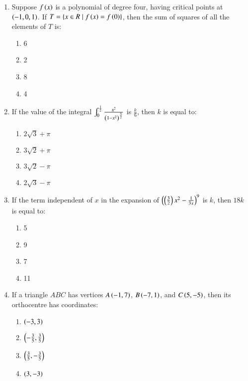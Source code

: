 \documentclass[journal,9pt,twocolumn]{IEEEtran}
\begin{document}
\begin{enumerate}
\item Suppose $f\left(x\right)$ is a polynomial of degree four, having critical points at $\left(-1, 0, 1\right)$. If $T = \{ x \in R \mid f\left(x\right) = f\left(0\right) \}$, then the sum of squares of all the elements of $T$ is:
        \begin{multicols}{4}

\begin{enumerate}
    \item 6
    \item 2
    \item 8
    \item 4
\end{enumerate}
\end{multicols}

\item If the value of the integral $ \int_{0}^{\frac{1}{2}} \frac{x^2}{\left(1 - x^2\right)^{\frac{3}{2}}}$ is $\frac{k}{6}$, then $k$ is equal to:
        
        \begin{multicols}{2}
\begin{enumerate}
    \item $2\sqrt{3} + \pi$
    \item $3\sqrt{2} + \pi$
    \item $3\sqrt{2} - \pi$
    \item $2\sqrt{3} - \pi$
\end{enumerate}
\end{multicols}

 \item If the term independent of $x$ in the expansion of $\left( \left( \frac{3}{2} \right) x^2 - \frac{1}{3x} \right)^9$ is $k$, then $18k$ is equal to:
        \begin{multicols}{4}

\begin{enumerate}
    \item 5
    \item 9
    \item 7
    \item 11
\end{enumerate}
\end{multicols}

\item If a triangle $ABC$ has vertices $A\left(-1, 7\right)$, $B\left(-7, 1\right)$, and $C\left(5, -5\right)$, then its orthocentre has coordinates:
        \begin{multicols}{2}

\begin{enumerate}
    \item $\left(-3, 3\right)$
    \item $\left(-\frac{3}{5}, \frac{3}{5}\right)$
    \item $\left(\frac{3}{5}, -\frac{3}{5}\right)$
    \item $\left(3, -3\right)$
\end{enumerate}
\end{multicols}


\end{enumerate}
\end{document}
